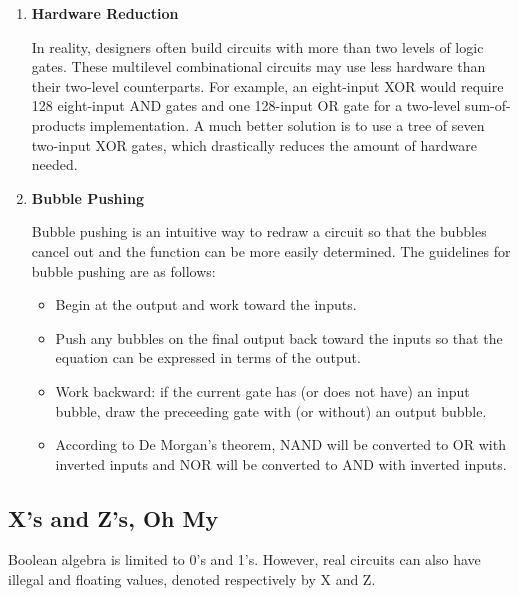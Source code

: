\documentclass[12pt]{article}
\begin{document}
\begin{enumerate}
    \item \textbf{Hardware Reduction}

    In reality, designers often build circuits with more than two levels of logic gates. These multilevel combinational circuits may use less hardware than their two-level counterparts. For example, an eight-input XOR would require 128 eight-input AND gates and one 128-input OR gate for a two-level sum-of-products implementation. A much better solution is to use a tree of seven two-input XOR gates, which drastically reduces the amount of hardware needed.

    \item \textbf{Bubble Pushing}

    Bubble pushing is an intuitive way to redraw a circuit so that the bubbles cancel out and the function can be more easily determined. The guidelines for bubble pushing are as follows:

    \begin{itemize}
        \item Begin at the output and work toward the inputs.
        \item Push any bubbles on the final output back toward the inputs so that the equation can be expressed in terms of the output.
        \item Work backward: if the current gate has (or does not have) an input bubble, draw the preceeding gate with (or without) an output bubble.
        \item According to De Morgan's theorem, NAND will be converted to OR with inverted inputs and NOR will be converted to AND with inverted inputs.
    \end{itemize}
\end{enumerate}

\subsection{X's and Z's, Oh My}

Boolean algebra is limited to 0's and 1's. However, real circuits can also have illegal and floating values, denoted respectively by X and Z.
\end{document}
